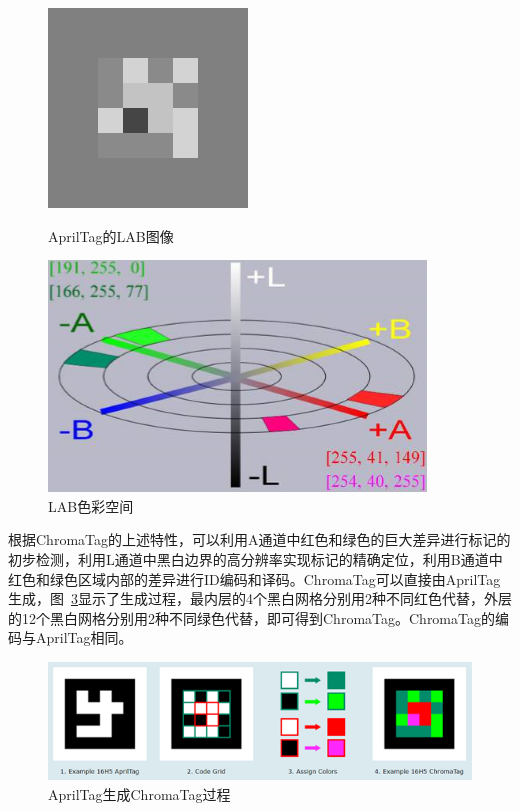 \begin{figure}[htb]
\begin{minipage}[t]{0.5\linewidth}
		\label{fig:2-11c} 
	\end{minipage}
	\begin{minipage}[t]{0.5\linewidth}
		\centering
		\includegraphics[width=0.7\columnwidth]{figures/2-11d.png} 
		\label{fig:2-11d} 
	\end{minipage}
	\caption{AprilTag的LAB图像}
	\label{fig:2-11}
\end{figure}

\begin{figure}[htb]
	\centering
	\includegraphics[width=0.5\linewidth]{figures/2-12.png}
	\caption{LAB色彩空间}
	\label{fig:2-12}
\end{figure}

根据ChromaTag的上述特性，可以利用A通道中红色和绿色的巨大差异进行标记的初步检测，利用L通道中黑白边界的高分辨率实现标记的精确定位，利用B通道中红色和绿色区域内部的差异进行ID编码和译码。ChromaTag可以直接由AprilTag生成，图~\ref{fig:2-13}显示了生成过程，最内层的4个黑白网格分别用2种不同红色代替，外层的12个黑白网格分别用2种不同绿色代替，即可得到ChromaTag。ChromaTag的编码与AprilTag相同。

\begin{figure}[htb]
	\centering
	\includegraphics[width=\linewidth]{figures/2-13.png}
	\caption{AprilTag生成ChromaTag过程}
	\label{fig:2-13}
\end{figure}

